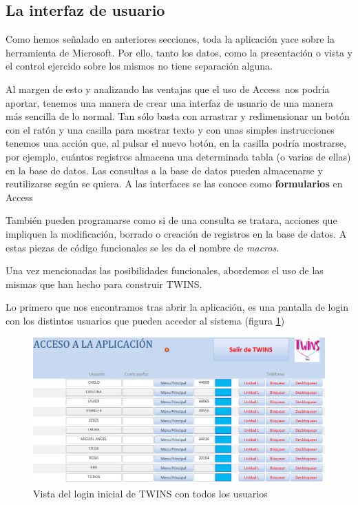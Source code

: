 \subsection{La interfaz de usuario}

Como hemos señalado en anteriores secciones, toda la aplicación yace sobre la herramienta de Microsoft\textregistered. Por ello, tanto los datos, como la presentación o vista y el control ejercido sobre los mismos no tiene separación alguna.

Al margen de esto y analizando las ventajas que el uso de Access\textregistered \ nos podría aportar, tenemos una manera de crear una interfaz de usuario de una manera más sencilla de lo normal. Tan sólo basta con arrastrar y redimensionar un botón con el ratón y una casilla para mostrar texto y con unas simples instrucciones tenemos una acción que, al pulsar el nuevo botón, en la casilla podría mostrarse, por ejemplo, cuántos registros almacena una determinada tabla (o varias de ellas) en la base de datos. Las consultas a la base de datos pueden almacenarse y reutilizarse según se quiera. A las interfaces se las conoce como \textbf{formularios} en Access\textregistered

También pueden programarse como si de una consulta se tratara, acciones que impliquen la modificación, borrado o creación de registros en la base de datos. A estas piezas de código funcionales se les da el nombre de \textit{macros}.

Una vez mencionadas las posibilidades funcionales, abordemos el uso de las mismas que han hecho para construir TWINS.

Lo primero que nos encontramos tras abrir la aplicación, es una pantalla de login con los distintos usuarios que pueden acceder al sistema (figura \ref{fig:login})

\begin{figure}
	\includegraphics[width=\textwidth]{img/Capturas de TWINS/login.png}
	\caption[Login de TWINS]{Vista del login inicial de TWINS con todos los usuarios}
	\label{fig:login}
\end{figure}


